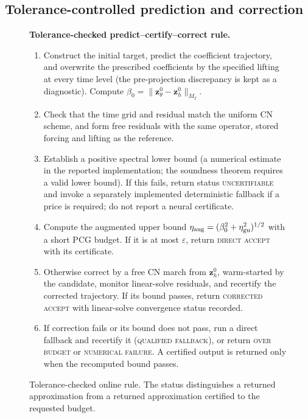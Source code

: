 \documentclass[11pt]{amsart}
\theoremstyle{remark}
\newcommand{\etaGuar}{\eta_{\mathrm{gu}}}
\newcommand{\zz}{\mathbf z}
\begin{document}
\subsection{Tolerance-controlled prediction and correction}
\label{ssec:algorithm}\label{ssec:two-stage}\label{ssec:correction}
\begin{figure}[!htbp]
\centering
\begin{minipage}{0.96\linewidth}
\textbf{Tolerance-checked predict--certify--correct rule.}
\begin{enumerate}[leftmargin=2em]
\item Construct the initial target, predict the coefficient trajectory, and
overwrite the prescribed coefficients by the specified lifting at every time
level (the pre-projection discrepancy is kept as a diagnostic). Compute
$\beta_0=\|\zz_\theta^0-\zz_h^0\|_{M_I}$.
\item Check that the time grid and residual match the uniform CN scheme, and form free residuals with the same operator, stored forcing
and lifting as the reference.
\item Establish a positive spectral lower bound (a numerical estimate
in the reported implementation; the soundness theorem requires a valid
lower bound). If this fails, return status \textsc{uncertifiable} and invoke a separately implemented
deterministic fallback if a price is required; do not report a neural certificate.
\item Compute the augmented upper bound $\eta_{\rm aug}=(\beta_0^2+\etaGuar^2)^{1/2}$
with a short PCG budget. If it is at most $\varepsilon$, return
\textsc{direct accept} with its certificate.
\item Otherwise correct by a free CN march from $\zz_h^0$, warm-started by the
candidate, monitor linear-solve residuals, and recertify the
corrected trajectory. If its bound passes, return \textsc{corrected accept}
with linear-solve convergence status recorded.
\item If correction fails or its bound does not pass, run a direct
fallback and recertify it (\textsc{qualified fallback}), or return
\textsc{over budget} or \textsc{numerical failure}. A certified output is returned only when the recomputed bound passes.
\end{enumerate}
\end{minipage}
\caption{Tolerance-checked online rule. The status distinguishes a returned
approximation from a returned approximation certified to the requested budget.}
\label{alg:pcc}
\end{figure}
\end{document}
